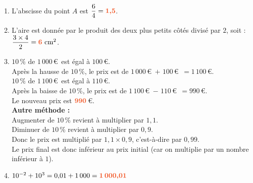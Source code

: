 \documentclass[a4paper,11pt]{article}
\begin{document}
\begin{seanceD}{}
\begin{enumerate}
	\item L'abscisse du point $A$ est $\dfrac{6}{4}={\color[HTML]{f15929}\boldsymbol{1{,}5}}$.
	\item L'aire est donnée par le produit des deux plus petits côtés divisé par $2$, soit : $\dfrac{3\times 4}{2}={\color[HTML]{f15929}\boldsymbol{6}}\text{ cm}^2$.
	\item  $10\,\%$ de  $1\,000$\,\euro{}~est égal à $100$\,\euro{}. \\
        Après la hausse de $10\,\%$, le prix est de $1\,000$\,\euro{}~$+$ $100$\,\euro{}~$=1\,100$\,\euro{}.\\
        $10\,\%$ de  $1\,100$\,\euro{}~est égal à $110$\,\euro{}. \\
        Après la baisse de $10\,\%$, le prix est de  $1\,100$\,\euro{}~$-$ $110$\,\euro{}~$=990$\,\euro{}.\\
        Le nouveau prix est ${\color[HTML]{f15929}\boldsymbol{990}}$\,\euro{}. \\
        \textbf{Autre méthode :\\ }
        Augmenter de $10\,\%$ revient à multiplier par $1{,}1$.\\
Diminuer de $10\,\%$ revient à multiplier par $0{,}9$.\\
Donc le prix est multiplié par $1{,}1\times 0{,}9$, c'est-à-dire par $0{,}99$.\\
Le prix final est donc inférieur au prix initial (car on multiplie par un nombre inférieur à $1$).
        
	\item $
      10^{-2}+10^{3}=0{,}01 +1\,000
      ={\color[HTML]{f15929}\boldsymbol{1\,000{,}01}}$

\end{enumerate}


\end{seanceD}
\end{document}
